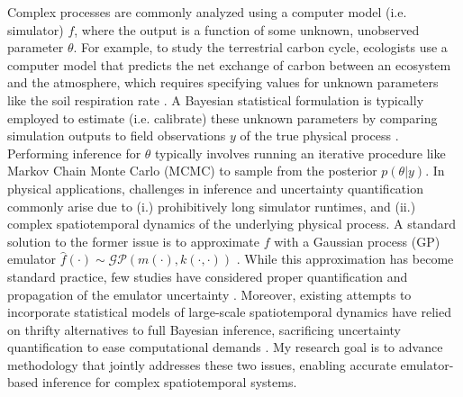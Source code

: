 \documentclass[11pt]{article}
\begin{document}
Complex processes are commonly analyzed using a computer model (i.e. simulator) $f$, where the output is a function of some unknown, unobserved parameter $\theta$.
For example, to study the terrestrial carbon cycle, ecologists use a computer model 
that predicts the net exchange of carbon between an ecosystem and the atmosphere, which requires specifying values for unknown parameters like the soil respiration rate \cite{Fer}.
A Bayesian statistical formulation is typically employed to estimate (i.e. calibrate) these unknown parameters by comparing simulation outputs to field observations $y$ of the true physical process \cite{Kennedy}. Performing inference for $\theta$ typically involves running an iterative procedure like Markov Chain Monte Carlo (MCMC) to sample from the posterior $p(\theta|y)$. In physical applications, challenges in inference and uncertainty quantification commonly arise due to (i.) prohibitively long simulator runtimes, and (ii.) complex spatiotemporal dynamics of the underlying physical process. A standard solution to the former issue is to approximate $f$ with a Gaussian process (GP) emulator $\hat{f}(\cdot) \sim \mathcal{GP}(m(\cdot), k(\cdot, \cdot))$ \cite{Fer, Kennedy, Cleary}. While this approximation has become standard practice, few studies have considered proper quantification and propagation of the emulator uncertainty \cite{Fer, Cleary}. Moreover, existing attempts to incorporate statistical models of large-scale spatiotemporal dynamics have relied on thrifty alternatives to full Bayesian inference, sacrificing uncertainty quantification to ease computational demands \cite{Sun}.
My research goal is to advance methodology that jointly addresses these two issues, enabling accurate emulator-based inference for complex spatiotemporal systems. 

\end{document}

